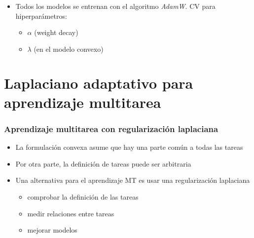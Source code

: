 \documentclass[aspectratio=43,spanish]{beamer}
\begin{document}
\begin{frame}
      \begin{itemize}
            \item Todos los modelos se entrenan con el algoritmo \emph{AdamW}. CV para hiperparámetros:
            \begin{itemize}
              \item $\alpha$ (weight decay)
              \item $\lambda$ (en el modelo convexo)
            \end{itemize}
      \end{itemize}
  
  \end{frame}




\section{Laplaciano adaptativo para aprendizaje multitarea}

\begin{frame}
      \frametitle{Aprendizaje multitarea con regularización laplaciana}

      \begin{itemize}
            \item La formulación convexa asume que hay una parte común a todas las tareas
            \vfill
            \item Por otra parte, la definición de tareas puede ser arbitraria
            \vfill
            \item Una alternativa para el aprendizaje MT es usar una regularización laplaciana
            \begin{itemize}
                  \item comprobar la definición de las tareas
                  \item medir relaciones entre tareas
                  \item mejorar modelos                  
            \end{itemize}
      \end{itemize}

\end{frame}
\end{document}

